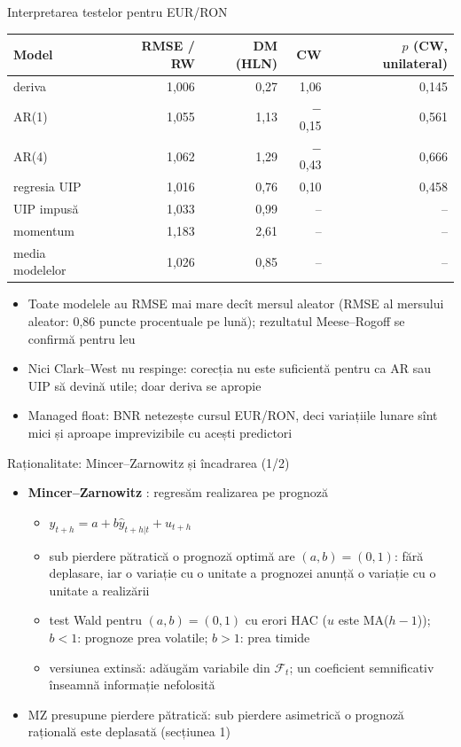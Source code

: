 \begin{frame}{Interpretarea testelor pentru EUR/RON}
\itemsize{\footnotesize}
\begin{center}
\scriptsize
\begin{tabular}{lrrrr}
\toprule
\textbf{Model} & \textbf{RMSE / RW} & \textbf{DM (HLN)} & \textbf{CW} & \textbf{$p$ (CW, unilateral)} \\
\midrule
deriva & 1{,}006 & 0{,}27 & 1{,}06 & 0{,}145 \\
AR(1) & 1{,}055 & 1{,}13 & \ensuremath{-}0{,}15 & 0{,}561 \\
AR(4) & 1{,}062 & 1{,}29 & \ensuremath{-}0{,}43 & 0{,}666 \\
regresia UIP & 1{,}016 & 0{,}76 & 0{,}10 & 0{,}458 \\
UIP impusă & 1{,}033 & 0{,}99 & -- & -- \\
momentum & 1{,}183 & 2{,}61 & -- & -- \\
media modelelor & 1{,}026 & 0{,}85 & -- & -- \\
\bottomrule
\end{tabular}
\end{center}
\begin{itemize}
    \item Toate modelele au RMSE mai mare decît mersul aleator (RMSE al mersului aleator: 0{,}86 puncte procentuale pe lună); rezultatul Meese--Rogoff se confirmă pentru leu
    \item Nici Clark--West nu respinge: corecția nu este suficientă pentru ca AR sau UIP să devină utile; doar deriva se apropie
    \item Managed float: BNR netezește cursul EUR/RON, deci variațiile lunare sînt mici și aproape imprevizibile cu acești predictori
\end{itemize}
\end{frame}

\begin{frame}{Raționalitate: Mincer--Zarnowitz și încadrarea (1/2)}
\itemsize{\small}
\begin{itemize}
    \item \textbf{Mincer--Zarnowitz} : regresăm realizarea pe prognoză
    \begin{itemize}
        \item $y_{t+h} = a + b\hat y_{t+h|t} + u_{t+h}$
        \item sub pierdere pătratică o prognoză optimă are $(a, b) = (0, 1)$: fără deplasare, iar o variație cu o unitate a prognozei anunță o variație cu o unitate a realizării
        \item test Wald pentru $(a, b) = (0, 1)$ cu erori HAC ($u$ este MA($h - 1$)); $b < 1$: prognoze prea volatile; $b > 1$: prea timide
        \item versiunea extinsă: adăugăm variabile din $\mathcal{F}_t$; un coeficient semnificativ înseamnă informație nefolosită
    \end{itemize}
    \item MZ presupune pierdere pătratică: sub pierdere asimetrică o prognoză rațională este deplasată (secțiunea 1)
\end{itemize}
\end{frame}

